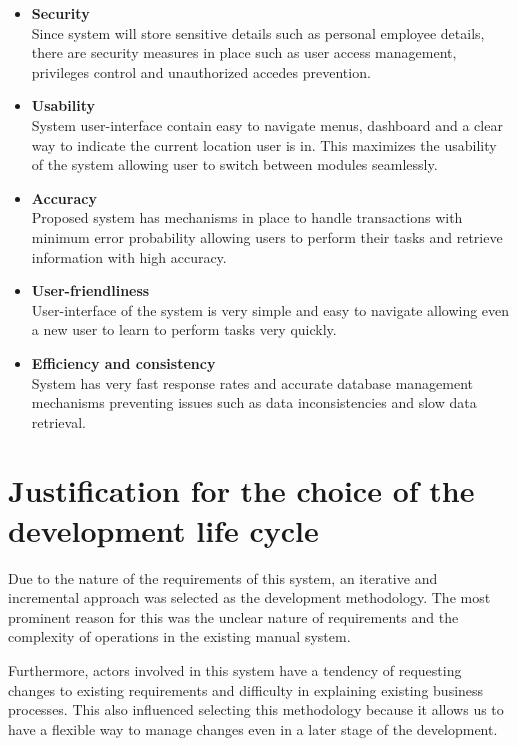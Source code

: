 \documentclass[12pt]{report}
\begin{document}
\begin{itemize}
	\item {\bf{Security}}\\
	      Since system will store sensitive details such as personal employee details, there are security measures in place such as user access management, privileges control and unauthorized accedes prevention.

	\item {\bf{Usability}}\\
	      System user-interface contain easy to navigate menus, dashboard and a clear way to indicate the current location user is in. This maximizes the usability of the system allowing user to switch between modules seamlessly.

	\item {\bf{Accuracy}}\\
	      Proposed system has mechanisms in place to handle transactions with minimum error probability allowing users to perform their tasks and retrieve information with high accuracy.

	\item {\bf{User-friendliness}}\\
	      User-interface of the system is very simple and easy to navigate allowing even a new user to learn to perform tasks very quickly.

	\item {\bf{Efficiency and consistency}}\\
	      System has very fast response rates and accurate database management mechanisms preventing issues such as data inconsistencies and slow data retrieval.
\end{itemize}

\section{Justification for the choice of the development life cycle}
Due to the nature of the requirements of this system, an iterative and incremental approach was selected as the development methodology. The most prominent reason for this was the unclear nature of requirements and the complexity of operations in the existing manual system.

Furthermore, actors involved in this system have a tendency of requesting changes to existing requirements and difficulty in explaining existing business processes. This also influenced selecting this methodology because it allows us to have a flexible way to manage changes even in a later stage of the development.
\end{document}
